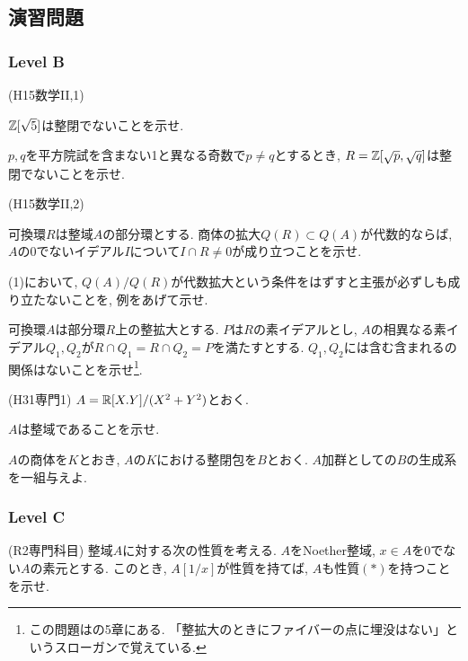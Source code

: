\clearpage
\subsection{演習問題}

\subsubsection{Level B}
\begin{prob} (H15数学II,1)
\ben
\item $\mathbb{Z}[\sqrt{5}]$は整閉でないことを示せ.
\item $p,q$を平方院試を含まない1と異なる奇数で$p\neq q$とするとき, $R=\mathbb{Z}[\sqrt{p},\sqrt{q}]$は整閉でないことを示せ.
\een
\end{prob}


\begin{prob} (H15数学II,2)
\ben
\item 可換環$R$は整域$A$の部分環とする. 商体の拡大$Q(R)\subset Q(A)$が代数的ならば, $A$の0でないイデアル$I$について$I\cap R \neq 0$が成り立つことを示せ.
\item (1)において, $Q(A)/Q(R)$が代数拡大という条件をはずすと主張が必ずしも成り立たないことを, 例をあげて示せ.
\item 可換環$A$は部分環$R$上の整拡大とする. $P$は$R$の素イデアルとし, $A$の相異なる素イデアル$Q_1,Q_2$が$R\cap Q_1 = R\cap Q_2 = P$を満たすとする. $Q_1,Q_2$には含む含まれるの関係はないことを示せ\footnote{この問題は\cite{atiyah}の5章にある. 「整拡大のときにファイバーの点に埋没はない」というスローガンで覚えている.}.
\een
\end{prob}

\begin{prob} (H31専門1)
$A=\mathbb{R}[X.Y]/(X^2+Y^2)$とおく.
\ben
\item $A$は整域であることを示せ.
\item $A$の商体を$K$とおき, $A$の$K$における整閉包を$B$とおく. $A$加群としての$B$の生成系を一組与えよ.
\een
\end{prob}

\subsubsection{Level C}
\begin{prob} (R2専門科目) \label{prob:R2senmon3}
整域$A$に対する次の性質を考える.
$A$をNoether整域, $x\in A$を0でない$A$の素元とする. このとき, $A[1/x]$が性質を持てば, $A$も性質$(\ast)$を持つことを示せ.
\end{prob}




